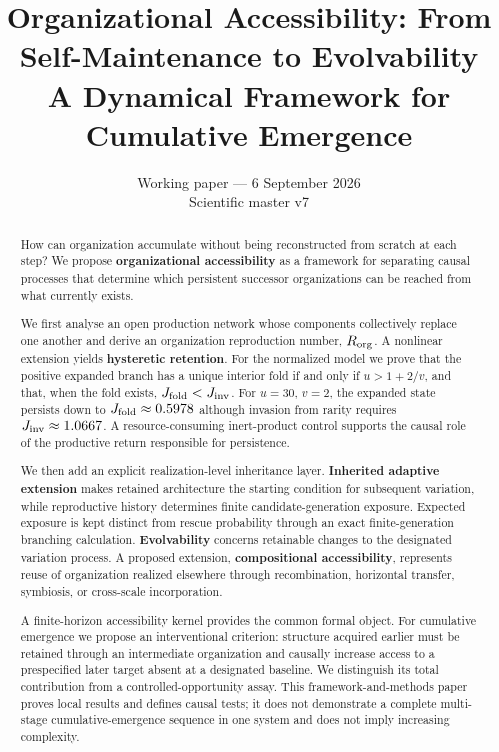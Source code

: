 \documentclass[11pt,a4paper]{article}
\title{\textbf{Organizational Accessibility: From Self-Maintenance to Evolvability}\\[0.5em]
\large A Dynamical Framework for Cumulative Emergence}
\author{} %
\date{Working paper --- 6 September 2026\\\small Scientific master v7}
\begin{document}
\maketitle

\begin{abstract}
How can organization accumulate without being reconstructed from scratch at each step? We propose \textbf{organizational accessibility} as a framework for separating causal processes that determine which persistent successor organizations can be reached from what currently exists.

We first analyse an open production network whose components collectively replace one another and derive an organization reproduction number, $R_{\rm org}$. A nonlinear extension yields \textbf{hysteretic retention}. For the normalized model we prove that the positive expanded branch has a unique interior fold if and only if $u>1+2/v$, and that, when the fold exists, $J_{\rm fold}<J_{\rm inv}$. For $u=30$, $v=2$, the expanded state persists down to $J_{\rm fold}\approx0.5978$ although invasion from rarity requires $J_{\rm inv}\approx1.0667$. A resource-consuming inert-product control supports the causal role of the productive return responsible for persistence.

We then add an explicit realization-level inheritance layer. \textbf{Inherited adaptive extension} makes retained architecture the starting condition for subsequent variation, while reproductive history determines finite candidate-generation exposure. Expected exposure is kept distinct from rescue probability through an exact finite-generation branching calculation. \textbf{Evolvability} concerns retainable changes to the designated variation process. A proposed extension, \textbf{compositional accessibility}, represents reuse of organization realized elsewhere through recombination, horizontal transfer, symbiosis, or cross-scale incorporation.

A finite-horizon accessibility kernel provides the common formal object. For cumulative emergence we propose an interventional criterion: structure acquired earlier must be retained through an intermediate organization and causally increase access to a prespecified later target absent at a designated baseline. We distinguish its total contribution from a controlled-opportunity assay. This framework-and-methods paper proves local results and defines causal tests; it does not demonstrate a complete multi-stage cumulative-emergence sequence in one system and does not imply increasing complexity.
\end{abstract}
\end{document}
